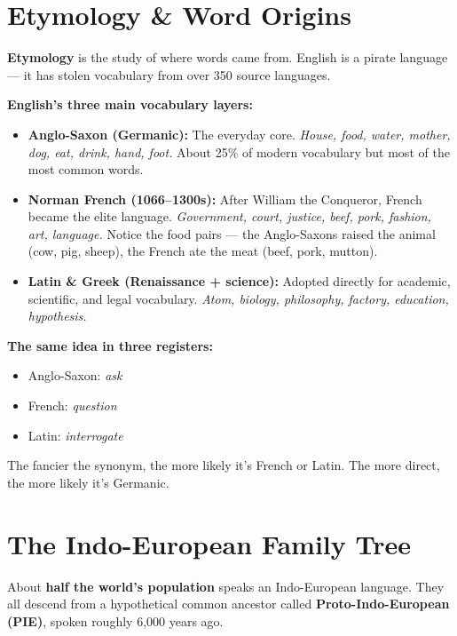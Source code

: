 \documentclass[11pt, letterpaper]{article}
\newcommand{\example}[1]{%
  \begin{tcolorbox}[colback=exbg, colframe=exborder,
    title={\bfseries Example}, arc=3pt, boxrule=1pt]
  #1
  \end{tcolorbox}%
}
\begin{document}
\vspace{8pt}

\section*{Etymology \& Word Origins}

\textbf{Etymology} is the study of where words came from. English is a pirate language --- it has stolen vocabulary from over 350 source languages.

\textbf{English's three main vocabulary layers:}
\begin{itemize}[noitemsep]
  \item \textbf{Anglo-Saxon (Germanic):} The everyday core. \emph{House, food, water, mother, dog, eat, drink, hand, foot.} About 25\% of modern vocabulary but most of the most common words.
  \item \textbf{Norman French (1066--1300s):} After William the Conqueror, French became the elite language. \emph{Government, court, justice, beef, pork, fashion, art, language.} Notice the food pairs --- the Anglo-Saxons raised the animal (cow, pig, sheep), the French ate the meat (beef, pork, mutton).
  \item \textbf{Latin \& Greek (Renaissance + science):} Adopted directly for academic, scientific, and legal vocabulary. \emph{Atom, biology, philosophy, factory, education, hypothesis.}
\end{itemize}

\example{
\textbf{The same idea in three registers:}
\begin{itemize}[noitemsep, leftmargin=*]
  \item Anglo-Saxon: \emph{ask}
  \item French: \emph{question}
  \item Latin: \emph{interrogate}
\end{itemize}
The fancier the synonym, the more likely it's French or Latin. The more direct, the more likely it's Germanic.
}

\section*{The Indo-European Family Tree}

About \textbf{half the world's population} speaks an Indo-European language. They all descend from a hypothetical common ancestor called \textbf{Proto-Indo-European (PIE)}, spoken roughly 6{,}000 years ago.
\end{document}
